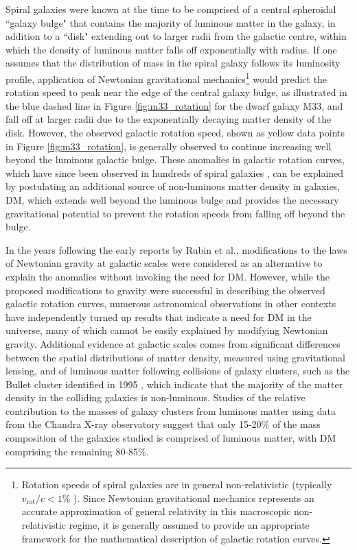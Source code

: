 Spiral galaxies were known at the time to be comprised of a central spheroidal ``galaxy bulge" that contains the majority of luminous matter in the galaxy, in addition to a ``disk" extending out to larger radii from the galactic centre, within which the density of luminous matter falls off exponentially with radius. If one assumes that the distribution of mass in the spiral galaxy follows its luminosity profile, application of Newtonian gravitational mechanics\footnote{Rotation speeds of spiral galaxies are in general non-relativistic (typically \(v_\text{rot}/c<1\%\) \cite{rotn_curves_1995}). Since Newtonian gravitational mechanics represents an accurate approximation of general relativity in this macroscopic non-relativistic regime, it is generally assumed to provide an appropriate framework for the mathematical description of galactic rotation curves.} would predict the rotation speed to peak near the edge of the central galaxy bulge, as illustrated in the blue dashed line in Figure \ref{fig:m33_rotation} for the dwarf galaxy M33, and fall off at larger radii due to the exponentially decaying matter density of the disk. However, the observed galactic rotation speed, shown as yellow data points in Figure \ref{fig:m33_rotation}, is generally observed to continue increasing well beyond the luminous galactic bulge. These anomalies in galactic rotation curves, which have since been observed in hundreds of spiral galaxies \cite{rotn_curves_1995}, can be explained by postulating an additional source of non-luminous matter density in galaxies, DM, which extends well beyond the luminous bulge and provides the necessary gravitational potential to prevent the rotation speeds from falling off beyond the bulge.

In the years following the early reports by Rubin et al., modifications to the laws of Newtonian gravity at galactic scales \cite{mond_1983} were considered as an alternative to explain the anomalies without invoking the need for DM. However, while the proposed modifications to gravity were successful in describing the observed galactic rotation curves, numerous astronomical observations in other contexts have independently turned up results that indicate a need for DM in the universe, many of which cannot be easily explained by modifying Newtonian gravity. Additional evidence at galactic scales comes from significant differences between the spatial distributions of matter density, measured using gravitational lensing, and of luminous matter following collisions of galaxy clusters, such as the Bullet cluster identified in 1995 \cite{bullet_1995}, which indicate that the majority of the matter density in the colliding galaxies is non-luminous. Studies of the relative contribution to the masses of galaxy clusters from luminous matter using data from the Chandra X-ray observatory \cite{Chandra_2013} suggest that only 15-20\% of the mass composition of the galaxies studied is comprised of luminous matter, with DM comprising the remaining 80-85\%.

